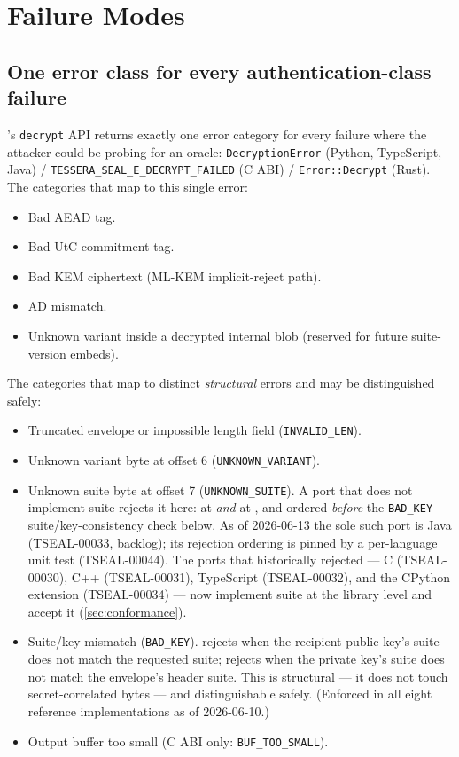 \section{Failure Modes}
\label{sec:failure-modes}

\subsection{One error class for every authentication-class failure}

\pqcrypt{}'s \texttt{decrypt} API returns exactly one error category for every failure where the attacker could be probing for an oracle: \texttt{DecryptionError} (Python, TypeScript, Java) / \texttt{TESSERA\_SEAL\_E\_DECRYPT\_FAILED} (C ABI) / \texttt{Error::Decrypt} (Rust). The categories that map to this single error:

\begin{itemize}
\item Bad AEAD tag.
\item Bad UtC commitment tag.
\item Bad KEM ciphertext (ML-KEM implicit-reject path).
\item AD mismatch.
\item Unknown variant inside a decrypted internal blob (reserved for future suite-version embeds).
\end{itemize}

The categories that map to distinct \emph{structural} errors and may be distinguished safely:

\begin{itemize}
\item Truncated envelope or impossible length field (\texttt{INVALID\_LEN}).
\item Unknown variant byte at offset 6 (\texttt{UNKNOWN\_VARIANT}).
\item Unknown suite byte at offset 7 (\texttt{UNKNOWN\_SUITE}). A port that does not implement suite  rejects it here: at  \emph{and} at , and ordered \emph{before} the \texttt{BAD\_KEY} suite/key-consistency check below. As of 2026-06-13 the sole such port is Java (TSEAL-00033, backlog); its rejection ordering is pinned by a per-language unit test (TSEAL-00044). The ports that historically rejected  --- C (TSEAL-00030), C++ (TSEAL-00031), TypeScript (TSEAL-00032), and the CPython extension (TSEAL-00034) --- now implement suite  at the library level and accept it (\cref{sec:conformance}).
\item Suite/key mismatch (\texttt{BAD\_KEY}).  rejects when the recipient public key's suite does not match the requested suite;  rejects when the private key's suite does not match the envelope's header suite. This is structural --- it does not touch secret-correlated bytes --- and distinguishable safely. (Enforced in all eight reference implementations as of 2026-06-10.)
\item Output buffer too small (C ABI only: \texttt{BUF\_TOO\_SMALL}).
\end{itemize}

